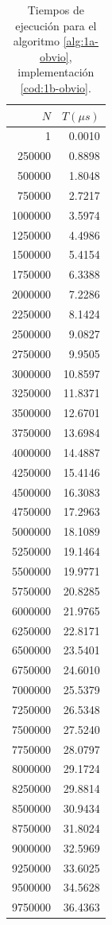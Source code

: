 \begin{table}
	\footnotesize
	\centering
	\begin{tabular}{|r|r|}
        \hline
        $N$ & $T (\mu s)$ \\
        \hline
		1 & 0.0010 \\ 
		250000 & 0.8898 \\ 
		500000 & 1.8048 \\ 
		750000 & 2.7217 \\ 
		1000000 & 3.5974 \\ 
		1250000 & 4.4986 \\ 
		1500000 & 5.4154 \\ 
		1750000 & 6.3388 \\ 
		2000000 & 7.2286 \\ 
		2250000 & 8.1424 \\ 
		2500000 & 9.0827 \\ 
		2750000 & 9.9505 \\ 
		3000000 & 10.8597 \\ 
		3250000 & 11.8371 \\ 
		3500000 & 12.6701 \\ 
		3750000 & 13.6984 \\ 
		4000000 & 14.4887 \\ 
		4250000 & 15.4146 \\ 
		4500000 & 16.3083 \\ 
		4750000 & 17.2963 \\ 
		5000000 & 18.1089 \\ 
		5250000 & 19.1464 \\ 
		5500000 & 19.9771 \\ 
		5750000 & 20.8285 \\ 
		6000000 & 21.9765 \\ 
		6250000 & 22.8171 \\ 
		6500000 & 23.5401 \\ 
		6750000 & 24.6010 \\ 
		7000000 & 25.5379 \\ 
		7250000 & 26.5348 \\ 
		7500000 & 27.5240 \\ 
		7750000 & 28.0797 \\ 
		8000000 & 29.1724 \\ 
		8250000 & 29.8814 \\ 
		8500000 & 30.9434 \\ 
		8750000 & 31.8024 \\ 
		9000000 & 32.5969 \\ 
		9250000 & 33.6025 \\ 
		9500000 & 34.5628 \\ 
		9750000 & 36.4363 \\ 
        \hline
	\end{tabular}

    \caption{Tiempos de ejecución para el algoritmo \ref{alg:1a-obvio}, implementación \ref{cod:1b-obvio}.}
    \label{tab:1b-obvio}
\end{table}

